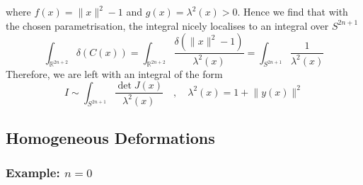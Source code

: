 \documentclass[a4paper,11pt]{article}
\theoremstyle{definition}
\newcommand{\RR}{\mathbb{R}}
\begin{document}
where $f(x) = \lVert x \rVert^2 - 1$ and  $g(x) = \lambda^2(x) > 0$.
Hence we find that with the chosen parametrisation, the integral nicely localises to an integral over $S^{2n + 1}$
\begin{equation}
  \int_{\RR^{2n + 2}} \delta(C(x)) = \int_{\RR^{2n+2}} \frac{\delta\left( \lVert x \rVert^2 - 1 \right)}{\lambda^2(x)} = \int_{S^{2n + 1}} \frac{1}{\lambda^2(x)}
\end{equation}
Therefore, we are left with an integral of the form 
\begin{equation}
  I \sim \int_{S^{2n + 1}} \frac{\det J(x)}{\lambda^2(x)} \quad , \quad \lambda^2(x) = 1 + \lVert y(x) \rVert^2
  \label{eq:toy_schema_I}
\end{equation}

\subsection{Homogeneous Deformations}

\subsubsection{Example: \texorpdfstring{$n=0$}{n=0}}
\end{document}
